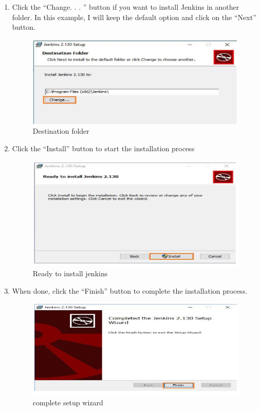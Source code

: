 \documentclass[12pt]{article}
\begin{document}
\begin{enumerate}
\item Click the “Change. . . ” button if you want to install Jenkins in another folder.
In this example, I will keep the default option and click on the “Next” button.

\begin{figure}[H]
\centering
\includegraphics[scale=0.8]{fig53}
\caption{Destination folder}
\vspace{0.6\baselineskip}
\end{figure}

\item Click the “Install” button to start the installation process

\begin{figure}[H]
\centering
\includegraphics[scale=0.8]{fig54}
\caption{Ready to install jenkins}
\vspace{0.6\baselineskip}
\end{figure}

\item When done, click the “Finish” button to complete the installation process.

\begin{figure}[H]
\centering
\includegraphics[scale=0.8]{fig55}
\caption{complete setup wizard}
\vspace{0.6\baselineskip}
\end{figure}


\end{enumerate}
\end{document}

